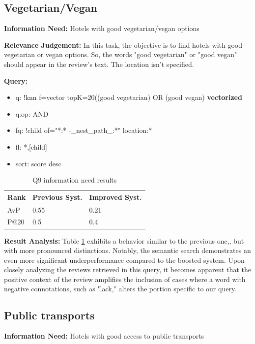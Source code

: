 \documentclass[sigconf]{acmart}
\begin{document}
\subsection{Vegetarian/Vegan}

\textbf{Information Need:} Hotels with good vegetarian/vegan options

\textbf{Relevance Judgement:} In this task, the objective is to find hotels with good vegetarian or vegan options. So, the words "good vegetarian" or "good vegan" should appear in the review's text. The location isn't specified.

\textbf{Query:}

\begin{itemize}
    \item q: {!knn f=vector topK=20}((good vegetarian) OR (good vegan) \textbf{vectorized}
    \item q.op: AND
    \item fq: {!child of="*:* -\_nest\_path\_:*"} location:*
    \item fl: *,[child]
    \item sort: score desc
\end{itemize}

\begin{table}[H]
\caption{Q9 information need results}
\label{tab:q9}
\begin{tabular}{lll}
\toprule
Rank & Previous Syst. & Improved Syst.\\
\midrule
AvP & 0.55 & 0.21  \\
P@20 & 0.5 & 0.4 \\
\bottomrule
\end{tabular}
\end{table}

\textbf{Result Analysis:} Table \ref{tab:q9} exhibits a behavior similar to the previous one,, but with more pronounced distinctions. Notably, the semantic search demonstrates an even more significant underperformance compared to the boosted system. 
Upon closely analyzing the reviews retrieved in this query, it becomes apparent that the positive context of the review amplifies the inclusion of cases where a word with negative connotations, such as "lack," alters the portion specific to our query.
\subsection{Public transports}

\textbf{Information Need:} Hotels with good access to public transports
\end{document}

